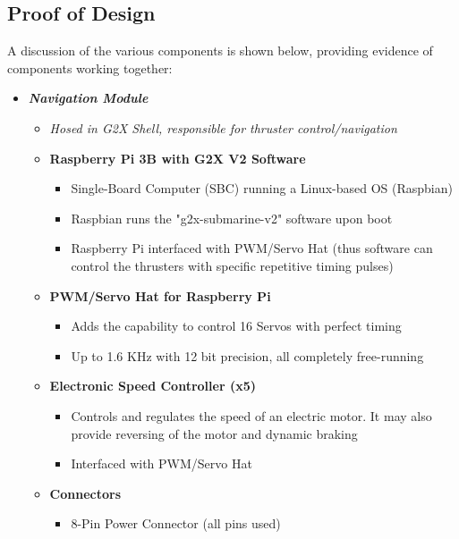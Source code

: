 \documentclass[12pt]{article}
\begin{document}
		\clearpage
		
		
		\subsection{Proof of Design}
		A discussion of the various components is shown below, providing evidence of components working together:\\
		
		{\renewcommand\labelitemi{}
			\begin{itemize}
				\item \textbf{\textit{Navigation Module}}
					\begin{itemize}
						\item[] \textit{Hosed in G2X Shell, responsible for thruster control/navigation\\}
						\item[] \textbf{Raspberry Pi 3B with G2X V2 Software}
						\begin{itemize}
							\item Single-Board Computer (SBC) running a Linux-based OS (Raspbian)
							\item Raspbian runs the "g2x-submarine-v2" software upon boot
							\item Raspberry Pi interfaced with PWM/Servo Hat (thus software can control the thrusters with specific repetitive timing pulses)
						\end{itemize}
						\item[] \textbf{PWM/Servo Hat for Raspberry Pi}
						\begin{itemize}
							\item Adds the capability to control 16 Servos with perfect timing
							\item Up to 1.6 KHz with 12 bit precision, all completely free-running
						\end{itemize}
						\item[] \textbf{Electronic Speed Controller (x5)}
						\begin{itemize}
							\item Controls and regulates the speed of an electric motor. It may also provide reversing of the motor and dynamic braking
							\item Interfaced with PWM/Servo Hat
						\end{itemize}
						\item[] \textbf{Connectors}
						\begin{itemize}
							\item 8-Pin Power Connector (all pins used)

\end{itemize}
\end{itemize}
\end{itemize}}
\end{document}
